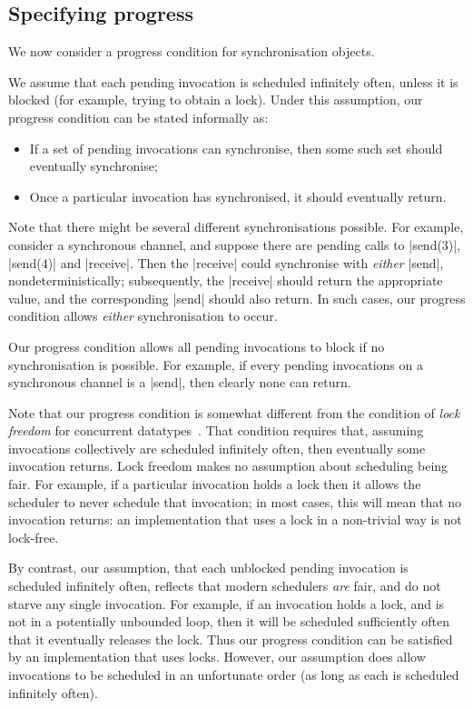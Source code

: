 
\subsection{Specifying progress}

We now consider a progress condition for synchronisation objects.  

We assume that each pending invocation is scheduled infinitely often, unless
it is blocked (for example, trying to obtain a lock).  Under this assumption,
our progress condition can be stated informally as:
%
\begin{itemize}
\item If a set of pending invocations can synchronise, then some such set
  should eventually synchronise;

\item Once a particular invocation has synchronised, it should eventually
  return.
\end{itemize}
%
Note that there might be several different synchronisations possible.  For
example, consider a synchronous channel, and suppose there are pending calls
to |send(3)|, |send(4)| and |receive|.  Then the |receive| could synchronise
with \emph{either} |send|, nondeterministically; subsequently, the |receive|
should return the appropriate value, and the corresponding |send| should also
return.  In such cases, our progress condition allows \emph{either}
synchronisation to occur.

Our progress condition allows all pending invocations to block if no
synchronisation is possible.  For example, if every pending invocations on a
synchronous channel is a |send|, then clearly none can return.

Note that our progress condition is somewhat different from the condition of
\emph{lock freedom} for concurrent datatypes~\cite{herlihy-shavit}.  That
condition requires that, assuming invocations collectively are scheduled
infinitely often, then eventually some invocation returns.  Lock freedom makes
no assumption about scheduling being fair.  For example, if a particular
invocation holds a lock then it allows the scheduler to never schedule that
invocation; in most cases, this will mean that no invocation returns: an
implementation that uses a lock in a non-trivial way is not lock-free.

By contrast, our assumption, that each unblocked pending invocation is
scheduled infinitely often, reflects that modern schedulers \emph{are} fair,
and do not starve any single invocation.  For example, if an invocation holds
a lock, and is not in a potentially unbounded loop, then it will be scheduled
sufficiently often that it eventually releases the lock.  Thus our progress
condition can be satisfied by an implementation that uses locks.  However, our
assumption does allow invocations to be scheduled in an unfortunate order (as
long as each is scheduled infinitely often).

